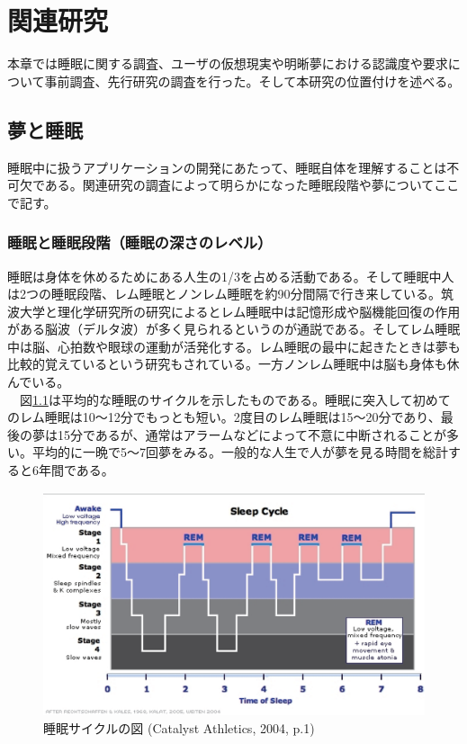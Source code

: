 \chapter{関連研究}
\label{chap:webapi}

本章では睡眠に関する調査、ユーザの仮想現実や明晰夢における認識度や要求について事前調査、先行研究の調査を行った。そして本研究の位置付けを述べる。

\section{夢と睡眠}
睡眠中に扱うアプリケーションの開発にあたって、睡眠自体を理解することは不可欠である。関連研究の調査によって明らかになった睡眠段階や夢についてここで記す。

\subsection{睡眠と睡眠段階（睡眠の深さのレベル）}
睡眠は身体を休めるためにある人生の1/3を占める活動である。そして睡眠中人は2つの睡眠段階、レム睡眠とノンレム睡眠を約90分間隔で行き来している\cite{Dement}。筑波大学と理化学研究所の研究によるとレム睡眠中は記憶形成や脳機能回復の作用がある脳波（デルタ波）が多く見られるというのが通説である\cite{tsukuba}。そしてレム睡眠中は脳、心拍数や眼球の運動が活発化する。レム睡眠の最中に起きたときは夢も比較的覚えているという研究もされている\cite{remNonRem}。一方ノンレム睡眠中は脳も身体も休んでいる。\\
　図\ref{SleepHypnogram}は平均的な睡眠のサイクルを示したものである\cite{hypnogram}。睡眠に突入して初めてのレム睡眠は10〜12分でもっとも短い。2度目のレム睡眠は15〜20分であり、最後の夢は15分であるが、通常はアラームなどによって不意に中断されることが多い。平均的に一晩で5〜7回夢をみる。一般的な人生で人が夢を見る時間を総計すると6年間である。
\begin{figure}[htbp]
\begin{center}
\includegraphics[width=15cm]{eps/SleepHypnogram.eps}
\caption{睡眠サイクルの図 (Catalyst Athletics, 2004, p.1) }
\label{SleepHypnogram}
\end{center}
\end{figure}


